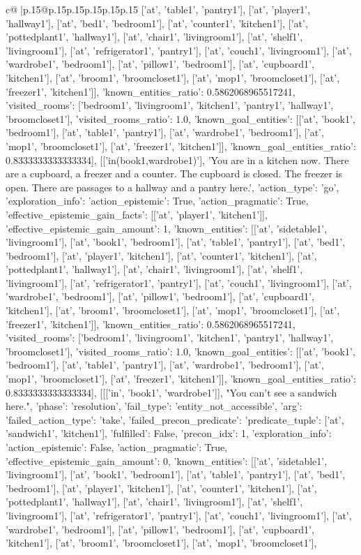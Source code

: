 \documentclass{article}
\begin{document}
{\begin{supertabular}{c@{$\;$}|p{.15\linewidth}@{}p{.15\linewidth}p{.15\linewidth}p{.15\linewidth}p{.15\linewidth}p{.15\linewidth}}
{{{['at', 'table1', 'pantry1'], ['at', 'player1', 'hallway1'], ['at', 'bed1', 'bedroom1'], ['at', 'counter1', 'kitchen1'], ['at', 'pottedplant1', 'hallway1'], ['at', 'chair1', 'livingroom1'], ['at', 'shelf1', 'livingroom1'], ['at', 'refrigerator1', 'pantry1'], ['at', 'couch1', 'livingroom1'], ['at', 'wardrobe1', 'bedroom1'], ['at', 'pillow1', 'bedroom1'], ['at', 'cupboard1', 'kitchen1'], ['at', 'broom1', 'broomcloset1'], ['at', 'mop1', 'broomcloset1'], ['at', 'freezer1', 'kitchen1']], 'known_entities_ratio': 0.5862068965517241, 'visited_rooms': ['bedroom1', 'livingroom1', 'kitchen1', 'pantry1', 'hallway1', 'broomcloset1'], 'visited_rooms_ratio': 1.0, 'known_goal_entities': [['at', 'book1', 'bedroom1'], ['at', 'table1', 'pantry1'], ['at', 'wardrobe1', 'bedroom1'], ['at', 'mop1', 'broomcloset1'], ['at', 'freezer1', 'kitchen1']], 'known_goal_entities_ratio': 0.8333333333333334}}], [['in(book1,wardrobe1)'], 'You are in a kitchen now. There are a cupboard, a freezer and a counter. The cupboard is closed. The freezer is open. There are passages to a hallway and a pantry here.', {'action_type': 'go', 'exploration_info': {'action_epistemic': True, 'action_pragmatic': True, 'effective_epistemic_gain_facts': [['at', 'player1', 'kitchen1']], 'effective_epistemic_gain_amount': 1, 'known_entities': [['at', 'sidetable1', 'livingroom1'], ['at', 'book1', 'bedroom1'], ['at', 'table1', 'pantry1'], ['at', 'bed1', 'bedroom1'], ['at', 'player1', 'kitchen1'], ['at', 'counter1', 'kitchen1'], ['at', 'pottedplant1', 'hallway1'], ['at', 'chair1', 'livingroom1'], ['at', 'shelf1', 'livingroom1'], ['at', 'refrigerator1', 'pantry1'], ['at', 'couch1', 'livingroom1'], ['at', 'wardrobe1', 'bedroom1'], ['at', 'pillow1', 'bedroom1'], ['at', 'cupboard1', 'kitchen1'], ['at', 'broom1', 'broomcloset1'], ['at', 'mop1', 'broomcloset1'], ['at', 'freezer1', 'kitchen1']], 'known_entities_ratio': 0.5862068965517241, 'visited_rooms': ['bedroom1', 'livingroom1', 'kitchen1', 'pantry1', 'hallway1', 'broomcloset1'], 'visited_rooms_ratio': 1.0, 'known_goal_entities': [['at', 'book1', 'bedroom1'], ['at', 'table1', 'pantry1'], ['at', 'wardrobe1', 'bedroom1'], ['at', 'mop1', 'broomcloset1'], ['at', 'freezer1', 'kitchen1']], 'known_goal_entities_ratio': 0.8333333333333334}}], [[['in', 'book1', 'wardrobe1']], "You can't see a sandwich here.", {'phase': 'resolution', 'fail_type': 'entity_not_accessible', 'arg': {'failed_action_type': 'take', 'failed_precon_predicate': {'predicate_tuple': ['at', 'sandwich1', 'kitchen1'], 'fulfilled': False, 'precon_idx': 1}}, 'exploration_info': {'action_epistemic': False, 'action_pragmatic': True, 'effective_epistemic_gain_amount': 0, 'known_entities': [['at', 'sidetable1', 'livingroom1'], ['at', 'book1', 'bedroom1'], ['at', 'table1', 'pantry1'], ['at', 'bed1', 'bedroom1'], ['at', 'player1', 'kitchen1'], ['at', 'counter1', 'kitchen1'], ['at', 'pottedplant1', 'hallway1'], ['at', 'chair1', 'livingroom1'], ['at', 'shelf1', 'livingroom1'], ['at', 'refrigerator1', 'pantry1'], ['at', 'couch1', 'livingroom1'], ['at', 'wardrobe1', 'bedroom1'], ['at', 'pillow1', 'bedroom1'], ['at', 'cupboard1', 'kitchen1'], ['at', 'broom1', 'broomcloset1'], ['at', 'mop1', 'broomcloset1'], }}}
\end{supertabular}}
\end{document}

